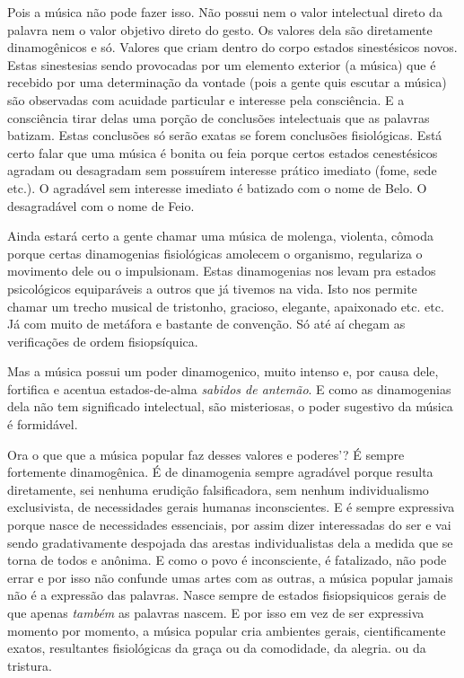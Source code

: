 Pois a música não pode fazer isso. Não possui nem o valor intelectual
direto da palavra nem o valor objetivo direto do gesto. Os valores dela
são diretamente dinamogênicos e só. Valores que criam dentro do corpo
estados sinestésicos novos. Estas sinestesias sendo provocadas por um
elemento exterior (a música) que é recebido por uma determinação da
vontade (pois a gente quis escutar a música) são observadas com acuidade
particular e interesse pela consciência. E a consciência tirar delas uma
porção de conclusões intelectuais que as palavras batizam. Estas
conclusões só serão exatas se forem conclusões fisiológicas. Está certo
falar que uma música é bonita ou feia porque certos estados cenestésicos
agradam ou desagradam sem possuírem interesse prático imediato (fome,
sede etc.). O agradável sem interesse imediato é batizado com o nome de
Belo. O desagradável com o nome de Feio.~

Ainda estará certo a gente chamar uma música de molenga, violenta,
cômoda porque certas dinamogenias fisiológicas amolecem o organismo,
regulariza o movimento dele ou o impulsionam. Estas dinamogenias nos
levam pra estados psicológicos equiparáveis a outros que já tivemos na
vida. Isto nos permite chamar um trecho musical de tristonho, gracioso,
elegante, apaixonado etc. etc. Já com muito de metáfora e bastante de
convenção. Só até aí chegam as verificações de ordem fisiopsíquica.

Mas a música possui um poder dinamogenico, muito intenso e, por causa
dele, fortifica e acentua estados-de-alma \emph{sabidos de antemão}. E
como as dinamogenias dela não tem significado intelectual, são
misteriosas, o poder sugestivo da música é formidável.

Ora o que que a música popular faz desses valores e poderes'? É sempre
fortemente dinamogênica. É de dinamogenia sempre agradável porque
resulta diretamente, sei nenhuma erudição falsificadora, sem nenhum
individualismo exclusivista, de necessidades gerais humanas
inconscientes. E é sempre expressiva porque nasce de necessidades
essenciais, por assim dizer interessadas do ser e vai sendo
gradativamente despojada das arestas individualistas dela a medida que
se torna de todos e anônima. E como o povo é inconsciente, é fatalizado,
não pode errar e por isso não confunde umas artes com as outras, a
música popular jamais não é a expressão das palavras. Nasce sempre de
estados fisiopsiquicos gerais de que apenas \emph{também} as palavras
nascem. E por isso em vez de ser expressiva momento por momento, a
música popular cria ambientes gerais, cientificamente exatos,
resultantes fisiológicas da graça ou da comodidade, da alegria. ou da
tristura.~


